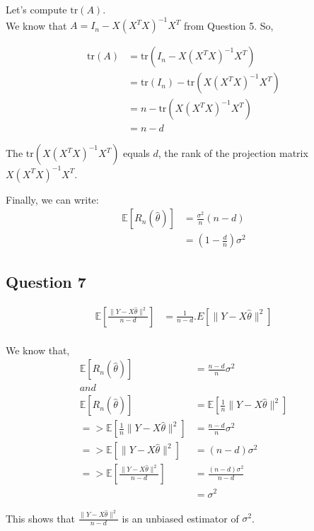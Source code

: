 \documentclass[11pt,a4paper]{article}
\theoremstyle{definition}
\theoremstyle{remark}
\begin{document}
Let's compute $\mathrm{tr}(A)$. \\
We know that $A = I_n - X(X^T X)^{-1} X^T$ from Question 5. So,

\begin{align}
\mathrm{tr}(A) &= \mathrm{tr}(I_n - X(X^T X)^{-1} X^T) \label{eq:64} \\
&= \mathrm{tr}(I_n) - \mathrm{tr}(X(X^T X)^{-1} X^T) \label{eq:65} \\
&= n - \mathrm{tr}(X(X^T X)^{-1} X^T) \label{eq:66} \\
&= n - d \label{eq:67}
\end{align}

The $\mathrm{tr}(X(X^T X)^{-1} X^T)$ equals $d$, the rank of the projection matrix $X(X^T X)^{-1} X^T$.

Finally, we can write:
\begin{align}
\mathbb{E}[R_n(\hat{\theta})] &= \frac{\sigma^2}{n} (n - d) \label{eq:68} \\
&= \left(1 - \frac{d}{n} \right) \sigma^2
\end{align}

\subsection{Question 7}

\begin{align}
\mathbb{E} \left[ \frac{\|Y - X\hat{\theta}\|^2}{n - d} \right] &= \frac{1}{n - d}.E\left[\|Y - X\hat{\theta}\|^2\right] \\
\end{align}

We know that, 
\begin{align}
\mathbb{E}[R_n(\hat{\theta})] &= \frac{n - d}{n} \sigma^2 \\
and \\
\mathbb{E}[R_n(\hat{\theta})] &= \mathbb{E} \left[ \frac{1}{n}\|Y - X\hat{\theta}\|^2 \right] \\
=> \mathbb{E} \left[ \frac{1}{n}\|Y - X\hat{\theta}\|^2 \right] &= \frac{n - d}{n} \sigma^2 \\
=> \mathbb{E} \left[ \|Y - X\hat{\theta}\|^2 \right] &= (n - d) \sigma^2 \\
=> \mathbb{E} \left[ \frac{\|Y - X\hat{\theta}\|^2}{n - d} \right] &= \frac{(n - d) \sigma^2}{n - d} \\
&= \sigma^2 
\end{align}

This shows that $\frac{\|Y - X\hat{\theta}\|^2}{n - d}$ is an unbiased estimator of $\sigma^2$.
\end{document}
